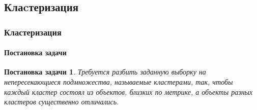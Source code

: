 \documentclass[xcolor=table]{beamer}
\newtheorem{prob}{Постановка задачи}
\begin{document}
\subsection{Клаcтеризация}
\begin{frame}
  \frametitle{Кластеризация}
  \framesubtitle{Постановка задачи}

  \begin{center}
  \end{center}

  \vspace{15pt}

  \begin{prob}
    Требуется разбить заданную выборку на непересекающиеся подмножества, называемые \emph{кластерами}, так, чтобы каждый кластер состоял из объектов, близких по метрике,
    а объекты разных кластеров существенно отличались.
  \end{prob}
\end{frame}
\end{document}
